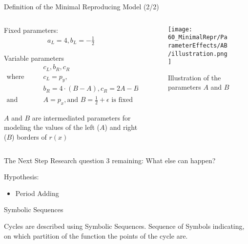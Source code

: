 \begin{frame}{Definition of the Minimal Reproducing Model (2/2)}
    \vspace{-1em}
    \begin{columns}
        \begin{column}{.7 \textwidth}
            Fixed parameters:
            \begin{align*}
                a_L = 4, b_L = -\frac{1}{2}
            \end{align*}

            Variable parameters
            \begin{align*}
                 & c_L, b_R, c_R                                                    \\
                \text{where} \qquad
                 & c_L = p_y,                                                       \\
                 & b_R = 4 \cdot (B - A), c_R = 2A - B                              \\
                \text {and} \qquad
                 & A = p_x, \text{and } B = \frac{1}{2} + \epsilon \text{ is fixed}
            \end{align*}

            $A$ and $B$ are intermediated parameters for modeling the values of the left ($A$) and right ($B$) borders of $r(x)$
        \end{column}
        \begin{column}{.3 \textwidth}
            \begin{figure}
                \centering
                \texttt{[image: 60\_MinimalRepr/ParameterEffects/AB/illustration.png]}
                \caption*{Illustration of the parameters $A$ and $B$}
            \end{figure}
        \end{column}
    \end{columns}
\end{frame}

\begin{frame}{The Next Step}
    Research question 3 remaining: What else can happen?

    \pause
    \vspace{2em}
    Hypothesis:
    \begin{itemize}
        \item Period Adding
    \end{itemize}
\end{frame}

\begin{frame}{Symbolic Sequences}

    Cycles are described using Symbolic Sequences.
    Sequence of Symbols indicating, on which partition of the function the points of the cycle are.
\end{frame}